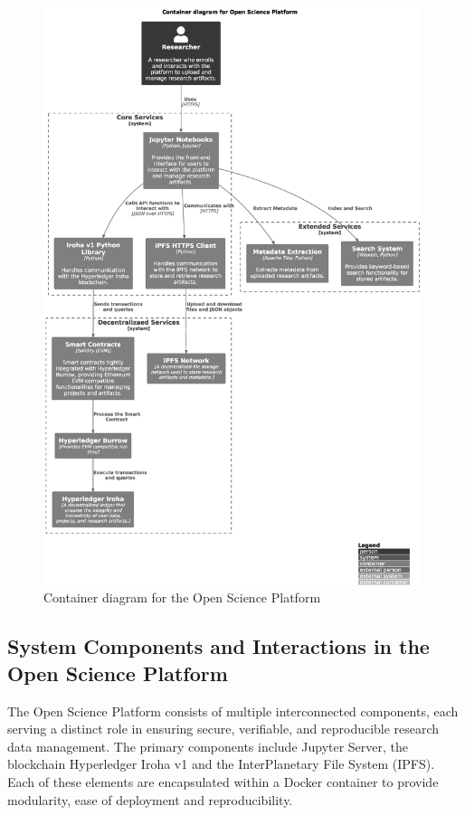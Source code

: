 \documentclass{article}
\begin{document}
\begin{figure}[htbp]
      \centering
      \includegraphics[width=0.98\textwidth, keepaspectratio]{c4_container_diagram}
      \caption{Container diagram for the Open Science Platform}
      \label{fig:c4_container_diagram}
\end{figure}


\subsection{System Components and Interactions in the Open Science Platform}

The Open Science Platform consists of multiple interconnected components, each serving a distinct role in ensuring secure, verifiable, and reproducible research data management. The primary components include Jupyter Server, the blockchain Hyperledger Iroha v1 and the InterPlanetary File System (IPFS). Each of these elements are encapsulated within a Docker container to provide modularity, ease of deployment and reproducibility.
\end{document}
